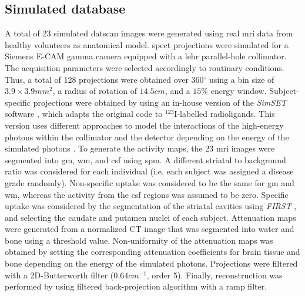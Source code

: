 \documentclass{frontiers}
\newcommand{\cbstart}{\relax}
\newcommand{\cbend}{\relax}
\newcommand{\degree}{\ensuremath{^{\circ}}}
\begin{document}
\subsection{Simulated database} %
\label{sec:data_simulated}
\cbstart
A total of 23 simulated \gls*{datscan} images were generated using real
  \gls*{mri} data from healthy volunteers as anatomical model.
\cbend
\Gls*{spect} projections were simulated for a Siemens E-CAM gamma
  camera equipped with a \acrlong*{lehr} parallel-hole collimator.
The acquisition parameters were selected accordingly to routinary conditions.
Thus, a total of 128 projections were obtained over 360{\degree} using a
  bin size of $3.9\times3.9mm^{2}$, a radius of rotation of $14.5cm$, and
  a $15\%$ energy window.
Subject-specific projections were obtained by using an in-house version
  \citep{crespo_quantification_2008} of the \emph{SimSET} software
  \citep{harrison_preliminary_1993}, which adapts the original code
  to $^{123}$I-labelled radioligands.
This version uses different approaches to model the interactions of
  the high-energy photons within the collimator and the detector depending
  on the energy of the simulated photons 
  \citep{cot_study_2004, cot_modeling_2006}.
To generate the activity maps, the 23 \gls*{mri} images
  were segmented into \gls*{gm}, \gls*{wm}, and \gls*{csf}
  using \gls*{spm}.
A different striatal to background ratio was considered for each individual
  (i.e. each subject was assigned a disease grade randomly).
Non-specific uptake was considered to be the same for \gls*{gm} and \gls*{wm},
  whereas the activity from the \gls*{csf} regions was assumed to be zero.
Specific uptake was considered by the segmentation of the striatal cavities
  using \emph{FIRST} \citep{patenaude_bayesian_2011},
  and selecting the caudate and putamen nuclei of each subject.
Attenuation maps were generated from a normalized CT image that was
  segmented into water and bone using a threshold value.
Non-uniformity of the attenuation maps was obtained by setting the
  corresponding attenuation coefficients for brain tissue and bone
  depending on the energy of the simulated photons.
Projections were filtered with a 2D-Butterworth filter ($0.64cm^{-1}$,
  order 5). Finally, reconstruction was performed by using filtered 
  back-projection algorithm with a ramp filter.
\end{document}
